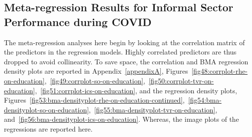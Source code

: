 \documentclass[12pt, english]{article}
\begin{document}
    \subsection{Meta-regression Results for Informal Sector Performance during COVID}\label{subsec:meta-regression-results-informal-sector-performance-during-covid}
    The meta-regression analyses here begin by looking at the correlation matrix of the predictors in the regression models. Highly correlated predictors are thus dropped to avoid collinearity. To save space, the correlation and BMA regression density plots are reported in Appendix~\ref{appendixA}, Figures~\ref{fig48:corrplot-rhe-on-education},~\ref{fig49:corrplot-so-on-education},~\ref{fig50:corrplot-tvr-on-education},~\ref{fig51:corrplot-ics-on-education}, and the regression density plots, Figures~\ref{fig53:bma-densityplot-rhe-on-education-continued},~\ref{fig54:bma-densityplot-so-on-education},~\ref{fig55:bma-densityplot-tvr-on-education}, and~\ref{fig56:bma-densityplot-ics-on-education}. Whereas, the image plots of the regressions are reported here.
\end{document}
